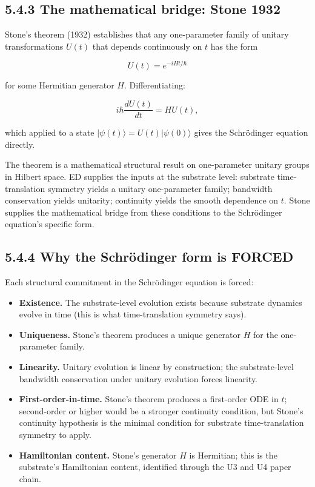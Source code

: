\documentclass[11pt]{book}
\begin{document}
\subsection{5.4.3 The mathematical bridge: Stone 1932}

Stone's theorem (1932) establishes that any one-parameter family of unitary transformations $U(t)$ that depends continuously on $t$ has the form

\[
U(t) = e^{-iHt/\hbar}
\]

for some Hermitian generator $H$. Differentiating:

\[
i\hbar\frac{d U(t)}{dt} = H U(t),
\]

which applied to a state $|\psi(t)\rangle = U(t)|\psi(0)\rangle$ gives the Schrödinger equation directly.

The theorem is a mathematical structural result on one-parameter unitary groups in Hilbert space. ED supplies the inputs at the substrate level: substrate time-translation symmetry yields a unitary one-parameter family; bandwidth conservation yields unitarity; continuity yields the smooth dependence on $t$. Stone supplies the mathematical bridge from these conditions to the Schrödinger equation's specific form.

\subsection{5.4.4 Why the Schrödinger form is FORCED}

Each structural commitment in the Schrödinger equation is forced:

\begin{itemize}
\item \textbf{Existence.} The substrate-level evolution exists because substrate dynamics evolve in time (this is what time-translation symmetry says).
\item \textbf{Uniqueness.} Stone's theorem produces a unique generator $H$ for the one-parameter family.
\item \textbf{Linearity.} Unitary evolution is linear by construction; the substrate-level bandwidth conservation under unitary evolution forces linearity.
\item \textbf{First-order-in-time.} Stone's theorem produces a first-order ODE in $t$; second-order or higher would be a stronger continuity condition, but Stone's continuity hypothesis is the minimal condition for substrate time-translation symmetry to apply.
\item \textbf{Hamiltonian content.} Stone's generator $H$ is Hermitian; this is the substrate's Hamiltonian content, identified through the U3 and U4 paper chain.
\end{itemize}
\end{document}
